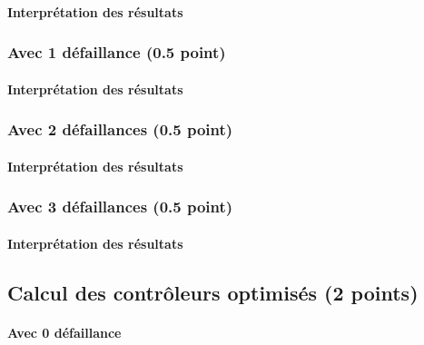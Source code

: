 \documentclass[a4paper]{book}
\begin{document}
\paragraph{Interprétation des résultats}

\subsubsection{Avec 1 défaillance (0.5 point)}





\paragraph{Interprétation des résultats}

\subsubsection{Avec 2 défaillances (0.5 point)}




%
\paragraph{Interprétation des résultats}

\subsubsection{Avec 3 défaillances (0.5 point)}




%
\paragraph{Interprétation des résultats}

\subsection{Calcul des contrôleurs optimisés (2 points)}
\paragraph{Avec 0 défaillance}\ \\

\end{document}
